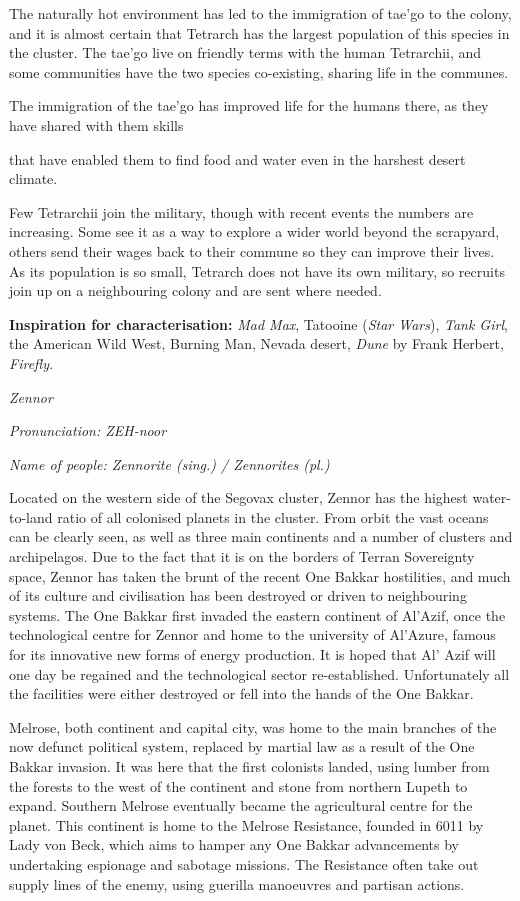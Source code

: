 \documentclass{scrbook}
\begin{document}
The naturally hot environment has led to the immigration of tae'go to the colony, and it is almost certain that Tetrarch has the largest population of this species in the cluster. The tae'go live on friendly terms with the human Tetrarchii, and some communities have the two species co-existing, sharing life in the communes.

The immigration of the tae'go has improved life for the humans there, as they have shared with them skills

that have enabled them to find food and water even in the harshest desert climate.

Few Tetrarchii join the military, though with recent events the numbers are increasing. Some see it as a way to explore a wider world beyond the scrapyard, others send their wages back to their commune so they can improve their lives. As its population is so small, Tetrarch does not have its own military, so recruits join up on a neighbouring colony and are sent where needed.

\textbf{Inspiration for characterisation:} \textit{Mad Max}, Tatooine (\textit{Star Wars}), \textit{Tank Girl}, the American Wild West, Burning Man, Nevada desert, \textit{Dune} by Frank Herbert, \textit{Firefly}.

\textit{Zennor}

\textit{Pronunciation: ZEH-noor}

\textit{Name of people: Zennorite (sing.) / Zennorites (pl.)}

Located on the western side of the Segovax cluster, Zennor has the highest water-to-land ratio of all colonised planets in the cluster. From orbit the vast oceans can be clearly seen, as well as three main continents and a number of clusters and archipelagos. Due to the fact that it is on the borders of Terran Sovereignty space, Zennor has taken the brunt of the recent One Bakkar hostilities, and much of its culture and civilisation has been destroyed or driven to neighbouring systems. The One Bakkar first invaded the eastern continent of Al'Azif, once the technological centre for Zennor and home to the university of Al'Azure, famous for its innovative new forms of energy production. It is hoped that Al' Azif will one day be regained and the technological sector re-established. Unfortunately all the facilities were either destroyed or fell into the hands of the One Bakkar.

Melrose, both continent and capital city, was home to the main branches of the now defunct political system, replaced by martial law as a result of the One Bakkar invasion. It was here that the first colonists landed, using lumber from the forests to the west of the continent and stone from northern Lupeth to expand. Southern Melrose eventually became the agricultural centre for the planet. This continent is home to the Melrose Resistance, founded in 6011 by Lady von Beck, which aims to hamper any One Bakkar advancements by undertaking espionage and sabotage missions. The Resistance often take out supply lines of the enemy, using guerilla manoeuvres and partisan actions.
\end{document}
